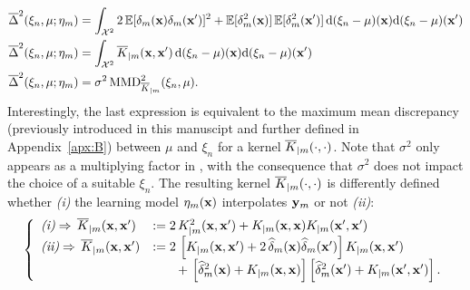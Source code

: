 \begin{subequations}
    \begin{align}
        \overline{\Delta}^2(\xi_n,\mu;\eta_m)&= \int_{\mathcal{X}^2} 2 \, \mathbb{E}[\delta_m({\bf x})\delta_m({\bf x}')]^2 + \mathbb{E}[\delta_m^2({\bf x})] \, \mathbb{E}[\delta_m^2({\bf x}')] \,\mathrm{d}(\xi_n-\mu)({\bf x})\mathrm{d}(\xi_n-\mu)({\bf x}') \\
        \overline{\Delta}^2(\xi_n,\mu;\eta_m)&= \int_{\mathcal{X}^2} \overline{K}_{|m}({\bf x}, {\bf x}')\,\mathrm{d}(\xi_n-\mu)({\bf x})\mathrm{d}(\xi_n-\mu)({\bf x}') \label{eq:c5_variance} \\
        \overline{\Delta}^2(\xi_n,\mu;\eta_m)&= \sigma^2\, \mathrm{MMD}_{\overline{K}_{|m}}^2(\xi_n,\mu).
    \end{align}
\end{subequations}
Interestingly, the last expression is equivalent to the maximum mean discrepancy (previously introduced in this manuscipt and further defined in Appendix~\ref{apx:B}) between $\mu$ and $\xi_n$ for a kernel $\overline{K}_{|m}(\cdot, \cdot)$. 
Note that $\sigma^2$ only appears as a multiplying factor in , with the consequence that $\sigma^2$ does not impact the choice of a suitable $\xi_n$.
The resulting kernel $\overline{K}_{|m}(\cdot, \cdot)$ is differently defined whether \textit{(i)} the learning model $\eta_m({\bf x})$ interpolates ${\bf y}_m$ or not \textit{(ii)}: 
\begin{align}
    \left\{
    \begin{array}{ll}
        \textit{(i)}  \Rightarrow  \, \overline{K}_{|m}({\bf x},{\bf x}')&:= 2\, K_{|m}^2({\bf x},{\bf x}') + K_{|m}({\bf x},{\bf x}) K_{|m}({\bf x}',{\bf x}')\\
        \textit{(ii)} \Rightarrow  \, \overline{K}_{|m}({\bf x},{\bf x}')&:= 2\, \left[K_{|m}({\bf x},{\bf x}') + 2\,\widehat\delta_m({\bf x})\widehat\delta_m({\bf x}')\right]K_{|m}({\bf x},{\bf x}') \\
                                                        & \qquad +\,\left[\widehat\delta_m^2({\bf x})+K_{|m}({\bf x},{\bf x})\right]\left[\widehat\delta_m^2({\bf x}')+K_{|m}({\bf x}',{\bf x}')\right]. 
        \label{Eq:Kbarbar}
    \end{array}
\right.
\end{align}


